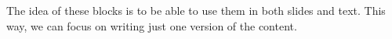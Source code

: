 \begin{idea}
  The idea of these blocks is to be able to use them in both slides and text.
  This way, we can focus on writing just one version of the content.
\end{idea}
